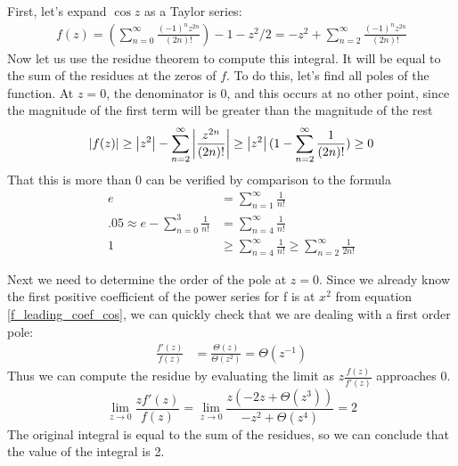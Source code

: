 \documentclass{homework}
\begin{document}
                      \begin{solution}
                      First, let's expand $\cos z$ as a Taylor series:
                      \begin{align}\label{f_leading_coef_cos}
                      f(z) = (\sum_{n=0}^\infty \frac{(-1)^nz^{2n}}{(2n)!}) - 1 - z^2/2 =-z^2 + \sum_{n=2}^\infty \frac{(-1)^nz^{2n}}{(2n)!}
                      \end{align}
                      Now let us use the residue theorem to compute this integral. It will be equal to the sum of the residues at the zeros of $f$. To do this, let's find all poles of the function. At $z=0$, the denominator is 0, and this occurs at no other point, since the magnitude of the first term will be greater than the magnitude of the rest 
                      \[
                      \left|f(z)\right| \geq \left|z^2\right| - \sum_{n=2}^\infty \left|\frac{z^{2n}}{(2n)!}\right| \geq  \left|z^2\right|(1 - \sum_{n=2}^\infty \frac{1}{(2n)!}) \geq 0
                      \]
                      That this is more than 0 can be verified by comparison to the formula 
                      \begin{align*}
                      e &= \sum_{n=1}^\infty \frac{1}{n!}\\
                      .05 \approx e - \sum_{n=0}^3 \frac{1}{n!} &= \sum_{n=4}^\infty \frac{1}{n!}\\
                      1 &\geq \sum_{n=4}^\infty \frac{1}{n!} \geq \sum_{n=2}^\infty \frac{1}{2n!}
                      \end{align*}

                      Next we need to determine the order of the pole at $z=0$. Since we already know the first positive coefficient of the power series for f is at $x^2$ from equation \ref{f_leading_coef_cos}, we can quickly check that we are dealing with a first order pole:
                      \begin{align*}
                          \frac{f'(z)}{f(z)} &= \frac{\Theta(z)}{\Theta(z^2)} = \Theta(z^{-1})
                          \end{align*}
                          Thus we can compute the residue by evaluating the limit as $z\frac{f(z)}{f'(z)}$ approaches 0.
                          \[
                          \lim_{z\to 0} \frac{zf'(z)}{f(z)} =  \lim_{z\to 0} \frac{z(-2z + \Theta(z^3))}{-z^2 + \Theta(z^4)} = 2
                          \]
                          The original integral is equal to the sum of the residues, so we can conclude that the value of the integral is 2.
                          \end{solution}
\end{document}
